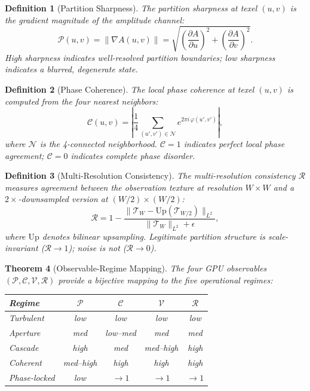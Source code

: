 \documentclass[11pt,twocolumn,a4paper]{article}
\newtheorem{theorem}{Theorem}[section]
\newtheorem{definition}[theorem]{Definition}
\newcommand{\Tex}{\mathcal{T}}
\begin{document}
\begin{definition}[Partition Sharpness]
\label{def:sharpness}
The partition sharpness at texel $(u,v)$ is the gradient magnitude of the amplitude channel:
\begin{equation}
\mathcal{P}(u,v) = \|\nabla A(u,v)\| = \sqrt{\left(\frac{\partial A}{\partial u}\right)^2 + \left(\frac{\partial A}{\partial v}\right)^2}.
\label{eq:sharpness}
\end{equation}
High sharpness indicates well-resolved partition boundaries; low sharpness indicates a blurred, degenerate state.
\end{definition}

\begin{definition}[Phase Coherence]
\label{def:phase-coherence}
The local phase coherence at texel $(u,v)$ is computed from the four nearest neighbors:
\begin{equation}
\mathcal{C}(u,v) = \left|\frac{1}{4}\sum_{(u',v') \in \mathcal{N}} e^{2\pi i\,\varphi(u',v')}\right|,
\label{eq:coherence}
\end{equation}
where $\mathcal{N}$ is the 4-connected neighborhood.
$\mathcal{C} = 1$ indicates perfect local phase agreement; $\mathcal{C} = 0$ indicates complete phase disorder.
\end{definition}

\begin{definition}[Multi-Resolution Consistency]
\label{def:multiresolution}
The multi-resolution consistency $\mathcal{R}$ measures agreement between the observation texture at resolution $W \times W$ and a $2\times$-downsampled version at $(W/2) \times (W/2)$:
\begin{equation}
\mathcal{R} = 1 - \frac{\|\Tex_W - \mathrm{Up}(\Tex_{W/2})\|_{L^2}}{\|\Tex_W\|_{L^2} + \epsilon},
\label{eq:multiresolution}
\end{equation}
where $\mathrm{Up}$ denotes bilinear upsampling.
Legitimate partition structure is scale-invariant ($\mathcal{R} \to 1$); noise is not ($\mathcal{R} \to 0$).
\end{definition}

\begin{theorem}[Observable-Regime Mapping]
\label{thm:observable-regime}
The four GPU observables $(\mathcal{P}, \mathcal{C}, \mathcal{V}, \mathcal{R})$ provide a bijective mapping to the five operational regimes:
\begin{center}
\begin{tabular}{lcccc}
\toprule
Regime & $\mathcal{P}$ & $\mathcal{C}$ & $\mathcal{V}$ & $\mathcal{R}$ \\
\midrule
Turbulent & low & low & low & low \\
Aperture & med & low--med & med & med \\
Cascade & high & med & med--high & high \\
Coherent & med--high & high & high & high \\
Phase-locked & low & $\to 1$ & $\to 1$ & $\to 1$ \\
\bottomrule
\end{tabular}
\end{center}
\end{theorem}
\end{document}
